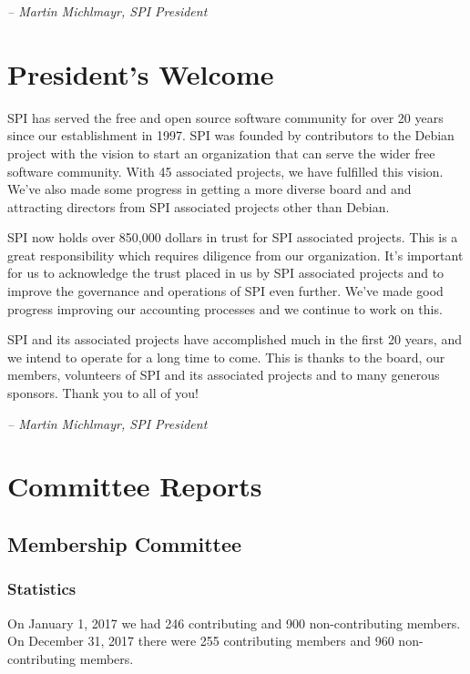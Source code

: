 \documentclass[a4paper]{report}
\begin{document}
  \emph{-- Martin Michlmayr, SPI President}

\newpage

\tableofcontents

\newpage

\chapter{President's Welcome}
\label{sec:president}

SPI has served the free and open source software community for over 20
years since our establishment in 1997.  SPI was founded by contributors
to the Debian project with the vision to start an organization that can
serve the wider free software community.  With 45 associated projects,
we have fulfilled this vision.  We've also made some progress in getting
a more diverse board and and attracting directors from SPI associated
projects other than Debian.

SPI now holds over 850,000 dollars in trust for SPI associated projects.
This is a great responsibility which requires diligence from our
organization.  It's important for us to acknowledge the trust placed in
us by SPI associated projects and to improve the governance and
operations of SPI even further.  We've made good progress improving our
accounting processes and we continue to work on this.

SPI and its associated projects have accomplished much in the first 20
years, and we intend to operate for a long time to come.  This is thanks
to the board, our members, volunteers of SPI and its associated projects
and to many generous sponsors.  Thank you to all of you!

  \emph{-- Martin Michlmayr, SPI President}

\chapter{Committee Reports}
\section{Membership Committee}

\subsection{Statistics}

On January 1, 2017 we had 246 contributing and 900 non-contributing
members.  On December 31, 2017 there were 255 contributing members and
960 non-contributing members.
\end{document}

